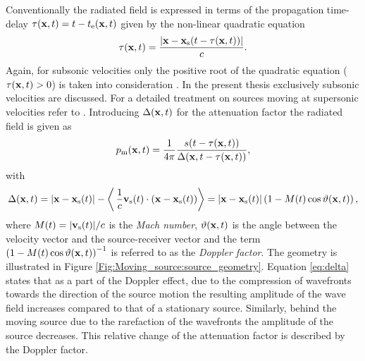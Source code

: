 Conventionally the radiated field is expressed in terms of the propagation time-delay $\tau(\mathbf{x},t) = t - t_{\mathrm{e}}(\mathbf{x},t)$ given by the non-linear quadratic equation
\begin{equation}
\tau(\mathbf{x},t) =  \frac{| \mathbf{x} - \mathbf{x}_{\mathrm{s}}( t - \tau(\mathbf{x},t)) |  }{c}.
\label{eq:tau}
\end{equation}
Again, for subsonic velocities only the positive root of the quadratic equation ($\tau(\mathbf{x},t)>0$) is taken into consideration \citep{deHoop2005}. 
In the present thesis exclusively subsonic velocities are discussed.
For a detailed treatment on sources moving at supersonic velocities refer to \cite{Ahrens2012, Ahrens2008moving_b}.
Introducing $\Delta(\mathbf{x},t)$ for the attenuation factor the radiated field is given as
\begin{equation}
p_{\mathrm{m}}(\mathbf{x},t) = \frac{1}{4\pi}\frac{s( t - \tau( \mathbf{x},t ) )}{\Delta(\mathbf{x},t-\tau( \mathbf{x}, t ))},
\label{eq:moving_source_field}
\end{equation}
with
\begin{equation}
\Delta( \mathbf{x},t ) = |\mathbf{x} - \mathbf{x}_{\mathrm{s}}(t)| - \left<\, \frac{1}{c}\mathbf{v}_{\mathrm{s}}(t) \cdot (\mathbf{x} - \mathbf{x}_{\mathrm{s}}(t)) \right> 
 =  |\mathbf{x} - \mathbf{x}_{\mathrm{s}}(t)|\left( 1 - M(t) \cos \vartheta(\mathbf{x},t) \right),
\label{eq:delta}
\end{equation}
where $M(t) = |\mathbf{v}_{\mathrm{s}}(t)|/c$ is the \emph{Mach number}, $\vartheta(\mathbf{x},t)$ is the angle between the velocity vector and the source-receiver vector and the term $\left( 1 - M(t) \cos \vartheta(\mathbf{x},t) \right)^{-1}$ is referred to as the \emph{Doppler factor}.%
The geometry is illustrated in Figure \ref{Fig:Moving_source:source_geometry}.
%
Equation \eqref{eq:delta} states that as a part of the Doppler effect, due to the compression of wavefronts towards the direction of the source motion the resulting amplitude of the wave field increases compared to that of a stationary source.
Similarly, behind the moving source due to the rarefaction of the wavefronts the amplitude of the source decreases.
This relative change of the attenuation factor is described by the Doppler factor.

